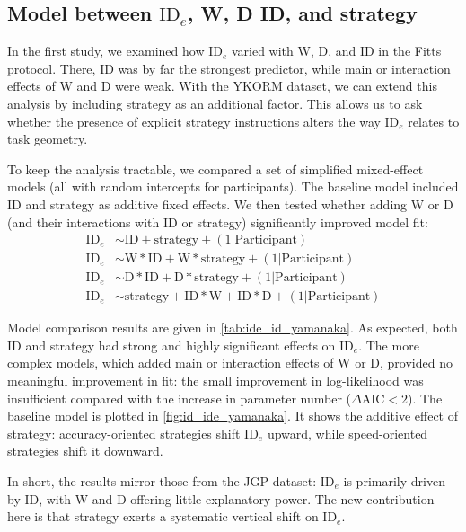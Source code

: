\documentclass[acmlarge, manuscript,review]{acmart}
\newcommand{\ide}{\ensuremath{{\text{ID}_e}}\xspace}
\newcommand{\D}{\ensuremath{{\text{D}}}\xspace}
\newcommand{\W}{\ensuremath{{\text{W}}}\xspace}
\begin{document}
\subsection{Model between \ide, W, D ID, and strategy}
In the first study, we examined how \ide varied with W, D, and ID in the Fitts protocol. There, ID was by far the strongest predictor, while main or interaction effects of W and D were weak. With the YKORM dataset, we can extend this analysis by including strategy as an additional factor. This allows us to ask whether the presence of explicit strategy instructions alters the way \ide relates to task geometry.


To keep the analysis tractable, we compared a set of simplified mixed-effect models (all with random intercepts for participants). The baseline model included ID and strategy as additive fixed effects. We then tested whether adding W or D (and their interactions with ID or strategy) significantly improved model fit:
\begin{align}
		\ide & \sim  \text{ID} + \text{strategy} + (1|\text{Participant})\label{eq:ide_id_yamanaka_short} \\
		\ide & \sim \W*\text{ID} + \W*\text{strategy} + (1|\text{Participant})\label{eq:ide_id_yamanaka_W}\\
	\ide & \sim \D*\text{ID} + \D*\text{strategy} + (1|\text{Participant})\label{eq:ide_id_yamanaka_D}\\
\ide & \sim \text{strategy} + \text{ID}*\W + \text{ID}*\D + (1|\text{Participant}) \label{eq:ide_id_yamanaka_full} 
\end{align}

Model comparison results are given in \autoref{tab:ide_id_yamanaka}. As expected, both ID and strategy had strong and highly significant effects on \ide. The more complex models, which added main or interaction effects of W or D, provided no meaningful improvement in fit: the small improvement in log-likelihood was insufficient compared with the increase in parameter number ($\Delta \text{AIC} < 2$). 
The baseline model is plotted in \autoref{fig:id_ide_yamanaka}. It shows the additive effect of strategy: accuracy-oriented strategies shift \ide upward, while speed-oriented strategies shift it downward. 

In short, the results mirror those from the JGP dataset: \ide is primarily driven by ID, with W and D offering little explanatory power. The new contribution here is that strategy exerts a systematic vertical shift on \ide.
\end{document}
